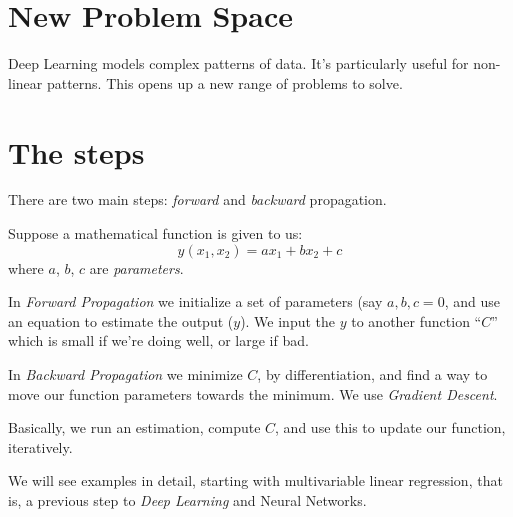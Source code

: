 
\section{New Problem Space}
Deep Learning models complex patterns of data. It's particularly useful for non-linear patterns. This opens up a new range of problems to solve. 

\section{The steps}
There are two main steps: \textit{forward} and \textit{backward} propagation. 

Suppose a mathematical function is given to us:
$$ y(x_1,x_2) = a x_1 + b x_2 + c$$
where $a$, $b$, $c$ are \textit{parameters}.

In \textit{Forward Propagation} we initialize a set of parameters (say $a,b,c=0$, and use an equation to estimate the output ($y$). We input the $y$ to another function ``$C$'' which is small if we're doing well, or large if bad.

In \textit{Backward Propagation} we minimize $C$, by differentiation, and find a way to move our function parameters towards the minimum. We use \textit{Gradient Descent}.

Basically, we run an estimation, compute $C$, and use this to update our function, iteratively.

We will see examples in detail, starting with multivariable linear regression, that is, a previous step to \textit{Deep Learning} and Neural Networks.

